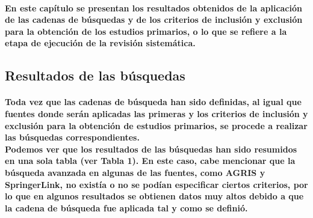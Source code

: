 \documentclass[10pt, twocolumn]{article}
\begin{document}
\paragraph{En este capítulo se presentan los resultados obtenidos de la aplicación de las cadenas de búsquedas y de los criterios de inclusión y exclusión para la obtención de los estudios primarios, o lo que se refiere a la etapa de ejecución de la revisión sistemática.}

\subsection{Resultados de las búsquedas}
\paragraph{Toda vez que las cadenas de búsqueda han sido definidas, al igual que fuentes donde serán aplicadas las primeras y los criterios de inclusión y exclusión para la obtención de estudios primarios, se procede a realizar las búsquedas correspondientes. \\ Podemos ver que los resultados de las búsquedas han sido resumidos en una sola tabla (ver Tabla 1). En este caso, cabe mencionar que la búsqueda avanzada en algunas de las fuentes, como AGRIS y SpringerLink, no existía o no se podían especificar ciertos criterios, por lo que en algunos resultados se obtienen datos muy altos debido a que la cadena de búsqueda fue aplicada tal y como se definió.}
\end{document}
